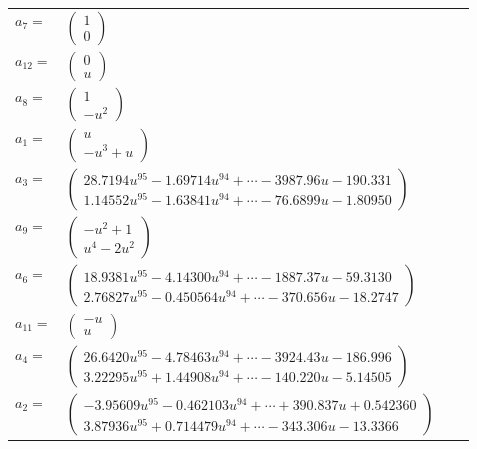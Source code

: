 \documentclass[1p]{elsarticle_modified}
\theoremstyle{definition}
\begin{document}
\begin{tabular}{m{7pt} m{180pt} m{7pt} m{180pt} }
\flushright $a_{7}=$&$\begin{pmatrix}1\\0\end{pmatrix}$ \\
\flushright $a_{12}=$&$\begin{pmatrix}0\\u\end{pmatrix}$ \\
\flushright $a_{8}=$&$\begin{pmatrix}1\\- u^2\end{pmatrix}$ \\
\flushright $a_{1}=$&$\begin{pmatrix}u\\- u^3+u\end{pmatrix}$ \\
\flushright $a_{3}=$&$\begin{pmatrix}28.7194 u^{95}-1.69714 u^{94}+\cdots-3987.96 u-190.331\\1.14552 u^{95}-1.63841 u^{94}+\cdots-76.6899 u-1.80950\end{pmatrix}$ \\
\flushright $a_{9}=$&$\begin{pmatrix}- u^2+1\\u^4-2 u^2\end{pmatrix}$ \\
\flushright $a_{6}=$&$\begin{pmatrix}18.9381 u^{95}-4.14300 u^{94}+\cdots-1887.37 u-59.3130\\2.76827 u^{95}-0.450564 u^{94}+\cdots-370.656 u-18.2747\end{pmatrix}$ \\
\flushright $a_{11}=$&$\begin{pmatrix}- u\\u\end{pmatrix}$ \\
\flushright $a_{4}=$&$\begin{pmatrix}26.6420 u^{95}-4.78463 u^{94}+\cdots-3924.43 u-186.996\\3.22295 u^{95}+1.44908 u^{94}+\cdots-140.220 u-5.14505\end{pmatrix}$ \\
\flushright $a_{2}=$&$\begin{pmatrix}-3.95609 u^{95}-0.462103 u^{94}+\cdots+390.837 u+0.542360\\3.87936 u^{95}+0.714479 u^{94}+\cdots-343.306 u-13.3366\end{pmatrix}$ \\

\end{tabular}
\end{document}
